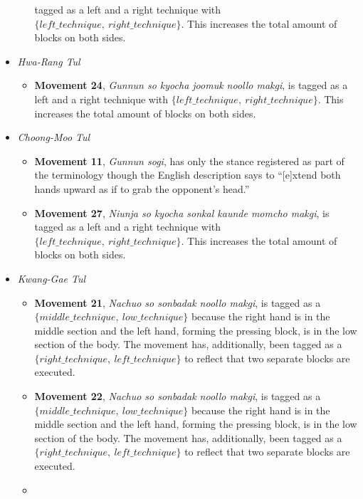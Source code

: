 \documentclass[10pt,twocolumn,a4paper]{article}
\begin{document}
\begin{itemize}
\begin{itemize}
        tagged as a left and a right technique with $\{left\_technique, \:
        right\_technique\}$. This increases the total amount of blocks on both
        sides.
    \end{itemize}
  \item
    \emph{Hwa-Rang Tul}
    \begin{itemize}
      \item
        {\bf Movement 24}, \emph{Gunnun so kyocha joomuk noollo makgi}, is
        tagged as a left and a right technique with $\{left\_technique, \:
        right\_technique\}$. This increases the total amount of blocks on both
        sides.
    \end{itemize}
  \item
    \emph{Choong-Moo Tul}
    \begin{itemize}
      \item
        {\bf Movement 11}, \emph{Gunnun sogi}, has only the stance registered
        as part of the terminology though the English description says to
        ``[e]xtend both hands upward as if to grab the opponent's head.''
      \item
        {\bf Movement 27}, \emph{Niunja so kyocha sonkal kaunde momcho makgi},
        is tagged as a left and a right technique with $\{left\_technique, \:
        right\_technique\}$. This increases the total amount of blocks on both
        sides.
    \end{itemize}
  \item
    \emph{Kwang-Gae Tul}
    \begin{itemize}
      \item
        {\bf Movement 21}, \emph{Nachuo so sonbadak noollo makgi}, is tagged as
        a $\{middle\_technique, \: low\_technique\}$ because the right hand is
        in the middle section and the left hand, forming the pressing block, is
        in the low section of the body. The movement has, additionally, been
        tagged as a $\{right\_technique, \: left\_technique\}$ to reflect that
        two separate blocks are executed.
      \item
        {\bf Movement 22}, \emph{Nachuo so sonbadak noollo makgi}, is tagged as
        a $\{middle\_technique, \: low\_technique\}$ because the right hand is
        in the middle section and the left hand, forming the pressing block, is
        in the low section of the body. The movement has, additionally, been
        tagged as a $\{right\_technique, \: left\_technique\}$ to reflect that
        two separate blocks are executed.
      \item

\end{itemize}
\end{itemize}
\end{document}
